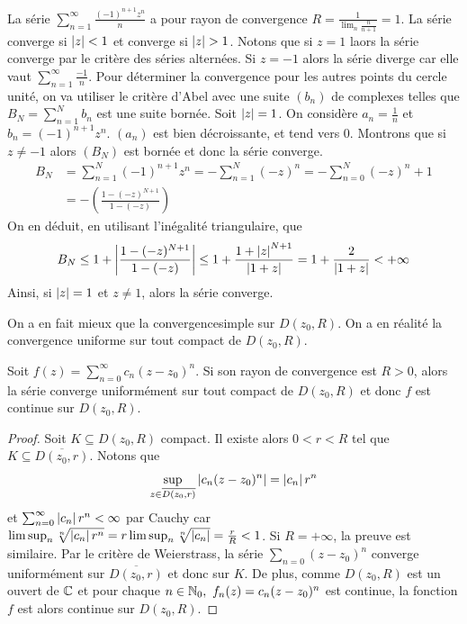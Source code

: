 \begin{exemple}
    La série $\sum_{n=1}^\infty\frac{(-1)^{n+1}z^n}{n}$ a pour rayon de convergence $R = \frac{1}{\lim_n\frac{n}{n+1} }= 1$. La série converge si $\left| z \right|<1$ et converge si $\abs{z}>1$. Notons que si $z = 1$ laors la série converge par le critère des séries alternées. Si $z = -1$ alors la série diverge car elle vaut $\sum_{n=1}^\infty\frac{-1}{n}$. Pour déterminer la convergence pour les autres points du cercle unité, on va utiliser le critère d'Abel avec une suite $(b_n)$ de complexes telles que $B_N = \sum_{n=1}^Nb_n$ est une suite bornée. Soit $\left| z \right| = 1$. On considère $a_n = \frac{1}{n}$ et $b_n = (-1)^{n+1}z^n$. $(a_n)$ est bien décroissante, et tend vers $0$. Montrons que si $z\ne -1$ alors $(B_N)$ est bornée et donc la série converge. \begin{align*}
        B_N &= \sum_{n=1}^N(-1)^{n+1}z^n = -\sum_{n=1}^N(-z)^n = -\sum_{n = 0}^N(-z)^n +1\\
        &= -\left(\frac{1 - (-z)^{N+1}}{1-(-z)}\right)
    \end{align*}
    On en déduit, en utilisant l'inégalité triangulaire, que 
    \begin{align*}
        B_N\le 1 + \left| \frac{1 - (-z)^{N+1}}{1-(-z)} \right|\le 1 +\frac{1 + \left| z \right|^{N+1}}{\left| 1+ z \right|} = 1 + \frac{2}{\left| 1 + z \right|}<+\infty 
    \end{align*}
    Ainsi, si $\left| z \right| = 1$ et $z\ne 1$, alors la série converge.
    \end{exemple}
    On a en fait mieux que la convergencesimple sur $D(z_0,R)$. On a en réalité la convergence uniforme sur tout compact de $D(z_0,R)$.
    \begin{proposition}
        Soit $f(z) = \sum_{ n = 0}^\infty c_n(z-z_0)^n$. Si son rayon de convergence est $R>0$, alors la série converge uniformément sur tout compact de $D(z_0,R)$ et donc $f$ est continue sur $D(z_0,R)$.
    \end{proposition}
\begin{proof}
        Soit $K\subseteq D(z_0,R)$ compact. Il existe alors $0<r<R$ tel que $K\subseteq \overline{D(z_0,r)}$. Notons que $$\sup_{z\in\overline{D(z_0,r)}}\left| c_n(z-z_0)^n \right| = \left| c_n \right| r^n$$ et $\sum_{n=0}^\infty\left| c_n \right|r^n<\infty$ par Cauchy car $\limsup_n\sqrt[n]{\left| c_n \right|r^n} = r\limsup_n\sqrt[n]{\left| c_n \right|} = \frac{r}{R}<1$. Si $R = +\infty$, la preuve est similaire. Par le critère de Weierstrass, la série $\sum_{n=0}(z-z_0)^n$ converge uniformément sur $\overline{D(z_0,r)}$ et donc sur $K$. De plus, comme $D(z_0,R)$ est un ouvert de $\mathbb{C}$ et pour chaque $n\in\mathbb{N}_0,\ f_n(z) = c_n(z-z_0)^n$ est continue, la fonction $f$ est alors continue sur $D(z_0, R)$.
\end{proof}
